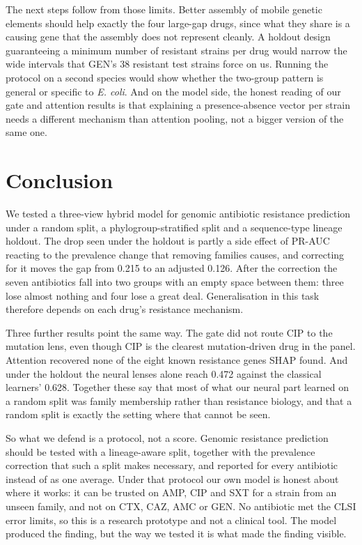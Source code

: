 \documentclass[conference]{IEEEtran}
\begin{document}
The next steps follow from those limits. Better assembly of mobile genetic elements
should help exactly the four large-gap drugs, since what they share is a causing
gene that the assembly does not represent cleanly. A holdout design guaranteeing a
minimum number of resistant strains per drug would narrow the wide intervals that
GEN's 38 resistant test strains force on us. Running the protocol on a second
species would show whether the two-group pattern is general or specific to
\textit{E. coli}. And on the model side, the honest reading of our gate and
attention results is that explaining a presence-absence vector per strain needs a
different mechanism than attention pooling, not a bigger version of the same one.

\section{Conclusion}
\label{sec:conclusion}

We tested a three-view hybrid model for genomic antibiotic resistance prediction
under a random split, a phylogroup-stratified split and a sequence-type lineage
holdout. The drop seen under the holdout is partly a side effect of PR-AUC reacting
to the prevalence change that removing families causes, and correcting for it moves
the gap from 0.215 to an adjusted 0.126. After the correction the seven antibiotics
fall into two groups with an empty space between them: three lose almost nothing and
four lose a great deal. Generalisation in this task therefore depends on each drug's
resistance mechanism.

Three further results point the same way. The gate did not route CIP to the mutation
lens, even though CIP is the clearest mutation-driven drug in the panel. Attention
recovered none of the eight known resistance genes SHAP found. And under the holdout
the neural lenses alone reach 0.472 against the classical learners' 0.628. Together
these say that most of what our neural part learned on a random split was family
membership rather than resistance biology, and that a random split is exactly the
setting where that cannot be seen.

So what we defend is a protocol, not a score. Genomic resistance prediction should
be tested with a lineage-aware split, together with the prevalence correction that
such a split makes necessary, and reported for every antibiotic instead of as one
average. Under that protocol our own model is honest about where it works: it can be
trusted on AMP, CIP and SXT for a strain from an unseen family, and not on CTX, CAZ,
AMC or GEN. No antibiotic met the CLSI error limits, so this is a research prototype
and not a clinical tool. The model produced the finding, but the way we tested it is
what made the finding visible.
\end{document}
